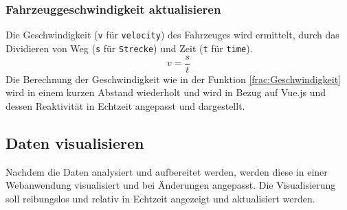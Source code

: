 \subsubsection*{Fahrzeuggeschwindigkeit aktualisieren}
Die Geschwindigkeit (\texttt{v} f\"ur \texttt{velocity}) des Fahrzeuges wird ermittelt, durch das Dividieren von Weg (\texttt{s} f\"ur \texttt{Strecke}) und Zeit (\texttt{t} f\"ur \texttt{time}). 
\begin{equation}
v = \frac{s}{t}
\label{frac:Geschwindigkeit}
\end{equation}
Die Berechnung der Geschwindigkeit wie in der Funktion \ref{frac:Geschwindigkeit} wird in einem kurzen Abstand wiederholt und wird in Bezug auf Vue.js und dessen Reaktivit\"at in Echtzeit angepasst und dargestellt.
\subsection*{Daten visualisieren}
Nachdem die Daten analysiert und aufbereitet werden, werden diese in einer Webanwendung visualisiert und bei \"Anderungen angepasst. Die Visualisierung soll reibungslos und relativ in Echtzeit angezeigt und aktualisiert werden.